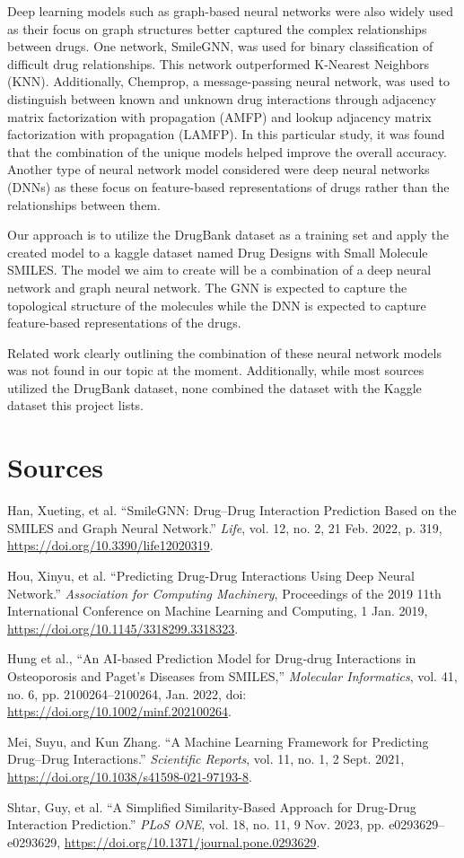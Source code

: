 \documentclass{report}
\begin{document}
Deep learning models such as graph-based neural networks were also widely used as their focus on graph structures better captured the complex relationships between drugs. One network, SmileGNN, was used for binary classification of difficult drug relationships. This network outperformed K-Nearest Neighbors (KNN). Additionally, Chemprop, a message-passing neural network, was used to distinguish between known and unknown drug interactions through adjacency matrix factorization with propagation (AMFP) and lookup adjacency matrix factorization with propagation (LAMFP). In this particular study, it was found that the combination of the unique models helped improve the overall accuracy. Another type of neural network model considered were deep neural networks (DNNs) as these focus on feature-based representations of drugs rather than the relationships between them.

Our approach is to utilize the DrugBank dataset as a training set and apply the created model to a kaggle dataset named Drug Designs with Small Molecule SMILES. The model we aim to create will be a combination of a deep neural network and graph neural network. The GNN is expected to capture the topological structure of the molecules while the DNN is expected to capture feature-based representations of the drugs.

Related work clearly outlining the combination of these neural network models was not found in our topic at the moment. Additionally, while most sources utilized the DrugBank dataset, none combined the dataset with the Kaggle dataset this project lists. 

\section{Sources}

Han, Xueting, et al. “SmileGNN: Drug–Drug Interaction Prediction Based on the SMILES and Graph Neural Network.” \textit{Life}, vol. 12, no. 2, 21 Feb. 2022, p. 319, \url{https://doi.org/10.3390/life12020319}. 

Hou, Xinyu, et al. “Predicting Drug-Drug Interactions Using Deep Neural Network.” \textit{Association for Computing Machinery}, Proceedings of the 2019 11th International Conference on Machine Learning and Computing, 1 Jan. 2019, \url{https://doi.org/10.1145/3318299.3318323}.

Hung et al., “An AI‐based Prediction Model for Drug‐drug Interactions in Osteoporosis and Paget’s Diseases from SMILES,” \textit{Molecular Informatics}, vol. 41, no. 6, pp. 2100264–2100264, Jan. 2022, doi: \url{https://doi.org/10.1002/minf.202100264}. 

Mei, Suyu, and Kun Zhang. “A Machine Learning Framework for Predicting Drug–Drug Interactions.” \textit{Scientific Reports}, vol. 11, no. 1, 2 Sept. 2021, \url{https://doi.org/10.1038/s41598-021-97193-8}.

Shtar, Guy, et al. “A Simplified Similarity-Based Approach for Drug-Drug Interaction Prediction.” \textit{PLoS ONE}, vol. 18, no. 11, 9 Nov. 2023, pp. e0293629–e0293629, \url{https://doi.org/10.1371/journal.pone.0293629}. 
\end{document}
